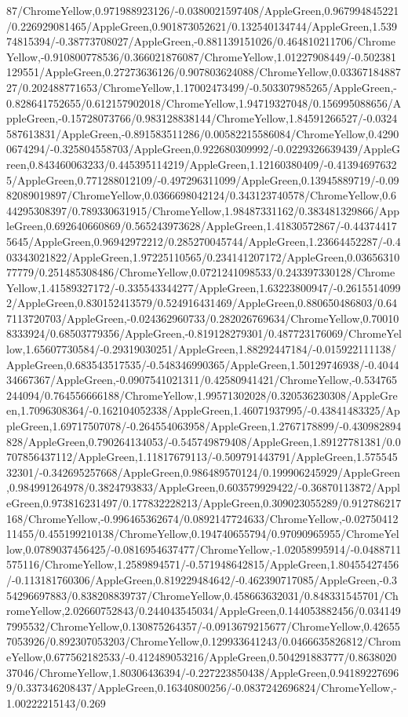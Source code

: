 {\begin{tikzternal}
87/ChromeYellow,0.971988923126/-0.0380021597408/AppleGreen,0.967994845221/0.226929081465/AppleGreen,0.901873052621/0.132540134744/AppleGreen,1.53974815394/-0.38773708027/AppleGreen,-0.881139151026/0.464810211706/ChromeYellow,-0.910800778536/0.366021876087/ChromeYellow,1.01227908449/-0.502381129551/AppleGreen,0.27273636126/0.907803624088/ChromeYellow,0.0336718488727/0.202488771653/ChromeYellow,1.17002473499/-0.503307985265/AppleGreen,-0.828641752655/0.612157902018/ChromeYellow,1.94719327048/0.156995088656/AppleGreen,-0.15728073766/0.983128838144/ChromeYellow,1.84591266527/-0.0324587613831/AppleGreen,-0.891583511286/0.00582215586084/ChromeYellow,0.42900674294/-0.325804558703/AppleGreen,0.922680309992/-0.0229326639439/AppleGreen,0.843460063233/0.445395114219/AppleGreen,1.12160380409/-0.413946976325/AppleGreen,0.771288012109/-0.497296311099/AppleGreen,0.13945889719/-0.0982089019897/ChromeYellow,0.0366698042124/0.343123740578/ChromeYellow,0.644295308397/0.789330631915/ChromeYellow,1.98487331162/0.383481329866/AppleGreen,0.692640660869/0.565243973628/AppleGreen,1.41830572867/-0.443744175645/AppleGreen,0.96942972212/0.285270045744/AppleGreen,1.23664452287/-0.403343021822/AppleGreen,1.97225110565/0.234141207172/AppleGreen,0.0365631077779/0.251485308486/ChromeYellow,0.0721241098533/0.243397330128/ChromeYellow,1.41589327172/-0.335543344277/AppleGreen,1.63223800947/-0.26155140992/AppleGreen,0.830152413579/0.524916431469/AppleGreen,0.880650486803/0.647113720703/AppleGreen,-0.024362960733/0.282026769634/ChromeYellow,0.700108333924/0.68503779356/AppleGreen,-0.819128279301/0.487723176069/ChromeYellow,1.65607730584/-0.29319030251/AppleGreen,1.88292447184/-0.015922111138/AppleGreen,0.683543517535/-0.548346990365/AppleGreen,1.50129746938/-0.404434667367/AppleGreen,-0.0907541021311/0.42580941421/ChromeYellow,-0.534765244094/0.764556666188/ChromeYellow,1.99571302028/0.320536230308/AppleGreen,1.7096308364/-0.162104052338/AppleGreen,1.46071937995/-0.43841483325/AppleGreen,1.69717507078/-0.264554063958/AppleGreen,1.2767178899/-0.430982894828/AppleGreen,0.790264134053/-0.545749879408/AppleGreen,1.89127781381/0.0707856437112/AppleGreen,1.11817679113/-0.509791443791/AppleGreen,1.57554532301/-0.342695257668/AppleGreen,0.986489570124/0.199906245929/AppleGreen,0.984991264978/0.3824793833/AppleGreen,0.603579929422/-0.36870113872/AppleGreen,0.973816231497/0.177832228213/AppleGreen,0.309023055289/0.912786217168/ChromeYellow,-0.996465362674/0.0892147724633/ChromeYellow,-0.0275041211455/0.455199210138/ChromeYellow,0.194740655794/0.97090965955/ChromeYellow,0.0789037456425/-0.0816954637477/ChromeYellow,-1.02058995914/-0.0488711575116/ChromeYellow,1.2589894571/-0.571948642815/AppleGreen,1.80455427456/-0.113181760306/AppleGreen,0.819229484642/-0.462390717085/AppleGreen,-0.354296697883/0.838208839737/ChromeYellow,0.458663632031/0.848331545701/ChromeYellow,2.02660752843/0.244043545034/AppleGreen,0.144053882456/0.0341497995532/ChromeYellow,0.130875264357/-0.0913679215677/ChromeYellow,0.426557053926/0.892307053203/ChromeYellow,0.129933641243/0.0466635826812/ChromeYellow,0.677562182533/-0.412489053216/AppleGreen,0.504291883777/0.863802037046/ChromeYellow,1.80306436394/-0.227223850438/AppleGreen,0.941892276969/0.337346208437/AppleGreen,0.16340800256/-0.0837242696824/ChromeYellow,-1.00222215143/0.269
\end{tikzternal}}
